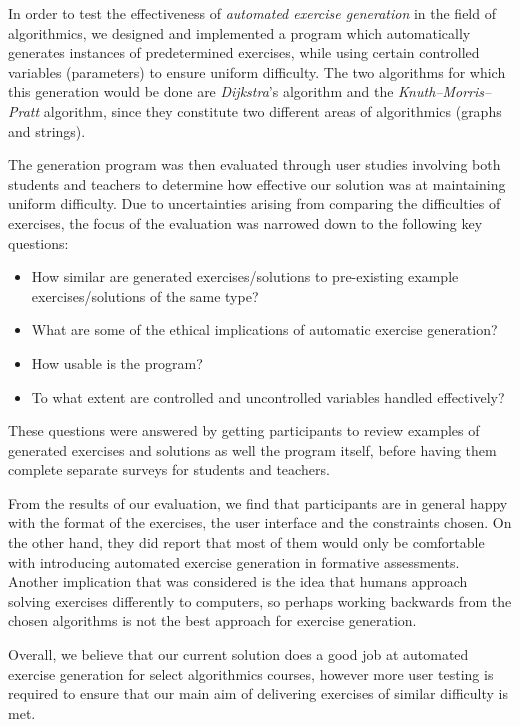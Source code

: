 \documentclass{l4proj}
\begin{document}
In order to test the effectiveness of \emph{automated exercise generation} in the field of algorithmics, we designed and implemented a program which automatically generates instances of predetermined exercises, while using certain controlled variables (parameters) to ensure uniform difficulty. The two algorithms for which this generation would be done are \emph{Dijkstra}'s algorithm and the \emph{Knuth–Morris–Pratt} algorithm, since they constitute two different areas of algorithmics (graphs and strings).

The generation program was then evaluated through user studies involving both students and teachers to determine how effective our solution was at maintaining uniform difficulty. Due to uncertainties arising from comparing the difficulties of exercises, the focus of the evaluation was narrowed down to the following key questions:

\begin{itemize}
	\item
	How similar are generated exercises/solutions to pre-existing example exercises/solutions of the same type?
	\item
	What are some of the ethical implications of automatic exercise generation?
	\item
	How usable is the program?
	\item
	To what extent are controlled and uncontrolled variables handled effectively?
\end{itemize}

These questions were answered by getting participants to review examples of generated exercises and solutions as well the program itself, before having them complete separate surveys for students and teachers. 

From the results of our evaluation, we find that participants are in general happy with the format of the exercises, the user interface and the constraints chosen. On the other hand, they did report that most of them would only be comfortable with introducing automated exercise generation in formative assessments. Another implication that was considered is the idea that humans approach solving exercises differently to computers, so perhaps working backwards from the chosen algorithms is not the best approach for exercise generation.

Overall, we believe that our current solution does a good job at automated exercise generation for select algorithmics courses, however more user testing is required to ensure that our main aim of delivering exercises of similar difficulty is met.
\end{document}

